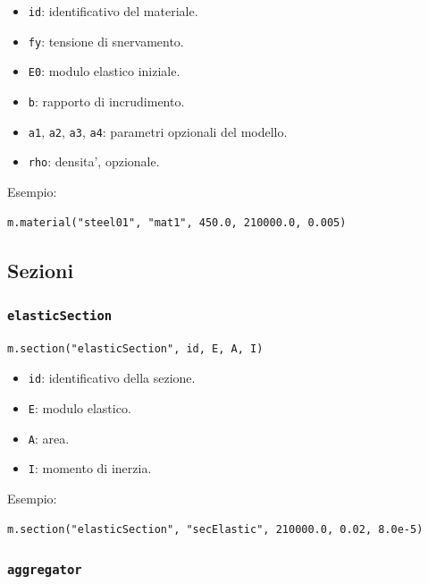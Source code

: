 \documentclass[11pt,a4paper]{article}
\begin{document}
\begin{itemize}
    \item \texttt{id}: identificativo del materiale.
    \item \texttt{fy}: tensione di snervamento.
    \item \texttt{E0}: modulo elastico iniziale.
    \item \texttt{b}: rapporto di incrudimento.
    \item \texttt{a1}, \texttt{a2}, \texttt{a3}, \texttt{a4}: parametri opzionali del modello.
    \item \texttt{rho}: densita', opzionale.
\end{itemize}

Esempio:

\begin{lstlisting}[style=pythonstyle]
m.material("steel01", "mat1", 450.0, 210000.0, 0.005)
\end{lstlisting}

\subsection{Sezioni}

\subsubsection{\texttt{elasticSection}}

\begin{lstlisting}[style=pythonstyle]
m.section("elasticSection", id, E, A, I)
\end{lstlisting}

\begin{itemize}
    \item \texttt{id}: identificativo della sezione.
    \item \texttt{E}: modulo elastico.
    \item \texttt{A}: area.
    \item \texttt{I}: momento di inerzia.
\end{itemize}

Esempio:

\begin{lstlisting}[style=pythonstyle]
m.section("elasticSection", "secElastic", 210000.0, 0.02, 8.0e-5)
\end{lstlisting}

\subsubsection{\texttt{aggregator}}
\end{document}
